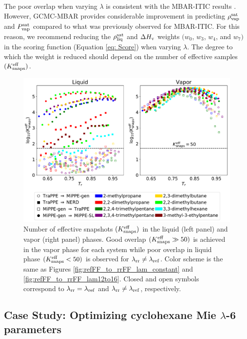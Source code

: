 \documentclass[journal=jced,manuscript=article]{achemso}
\begin{document}

The poor overlap when varying $\lambda$ is consistent with the MBAR-ITIC results \cite{Postdoc_1}. However, GCMC-MBAR provides considerable improvement in predicting $\rho_{\rm vap}^{\rm sat}$ and $P_{\rm vap}^{\rm sat}$ compared to what was previously observed for MBAR-ITIC. For this reason, we recommend reducing the $\rho_{\rm liq}^{\rm sat}$ and $\Delta H_{\rm v}$ weights $(w_0$, $w_3$, $w_4$, and $w_7)$ in the scoring function (Equation \ref{eq: Score}) when varying $\lambda$. The degree to which the weight is reduced should depend on the number of effective samples $(K_{\rm snaps}^{\rm eff})$.

	\begin{figure}[htb!]
		\centering
		\includegraphics[width=6.4in]{refFF_to_rrFF_Neff_alt.pdf}
		\caption{Number of effective snapshots $(K_{\rm snaps}^{\rm eff})$ in the liquid (left panel) and vapor (right panel) phases. Good overlap $(K_{\rm snaps}^{\rm eff} \gg 50)$ is achieved in the vapor phase for each system while poor overlap in liquid phase $(K_{\rm snaps}^{\rm eff} < 50)$ is observed for $\lambda_{\rm rr} \neq \lambda_{\rm ref}$. Color scheme is the same as Figures \ref{fig:refFF_to_rrFF_lam_constant} and \ref{fig:refFF_to_rrFF_lam12to16}. Closed and open symbols correspond to $\lambda_{\rm rr} = \lambda_{\rm ref}$ and $\lambda_{\rm rr} \neq \lambda_{\rm ref}$, respectively.}
		\label{fig:Neff}
	\end{figure} 

\subsection{Case Study: Optimizing cyclohexane Mie $\lambda$-6 parameters} \label{sec: Case study}
\end{document}
